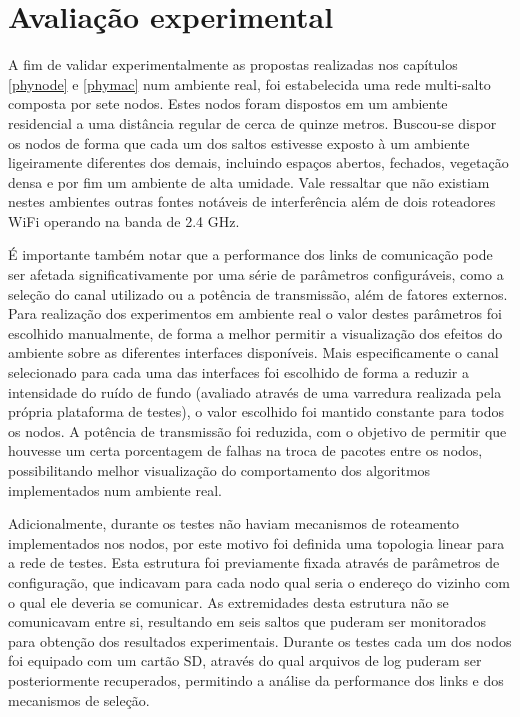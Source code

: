 \documentclass[
	12pt,				%
	openright,			%
	oneside,
	a4paper,			%
	english,			%
	french,				%
	spanish,			%
	brazil				%
	]{abntex2}
\begin{document}
\chapter{Avaliação experimental} \label{chap_exp}

A fim de validar experimentalmente as propostas realizadas nos capítulos \ref{phynode} e \ref{phymac} num ambiente real, foi estabelecida uma rede multi-salto composta por sete nodos. Estes nodos foram dispostos em um ambiente residencial a uma distância regular de cerca de quinze metros. Buscou-se dispor os nodos de forma que cada um dos saltos estivesse exposto à um ambiente ligeiramente diferentes dos demais, incluindo espaços abertos, fechados, vegetação densa e por fim um ambiente de alta umidade. Vale ressaltar que não existiam nestes ambientes outras fontes notáveis de interferência além de dois roteadores WiFi operando na banda de 2.4 GHz.

É importante também notar que a performance dos links de comunicação pode ser afetada significativamente por uma série de parâmetros configuráveis, como a seleção do canal utilizado ou a potência de transmissão, além de fatores externos. Para realização dos experimentos em ambiente real o valor destes parâmetros foi escolhido manualmente, de forma a melhor permitir a visualização dos efeitos do ambiente sobre as diferentes interfaces disponíveis. Mais especificamente o canal selecionado para cada uma das interfaces foi escolhido de forma a reduzir a intensidade do ruído de fundo (avaliado através de uma varredura realizada pela própria plataforma de testes), o valor escolhido foi mantido constante para todos os nodos. A potência de transmissão foi reduzida, com o objetivo de permitir que houvesse um certa porcentagem de falhas na troca de pacotes entre os nodos, possibilitando melhor visualização do comportamento dos algoritmos implementados num ambiente real.

Adicionalmente, durante os testes não haviam mecanismos de roteamento implementados nos nodos, por este motivo foi definida uma topologia linear para a rede de testes. Esta estrutura foi previamente fixada através de parâmetros de configuração, que indicavam para cada nodo qual seria o endereço do vizinho com o qual ele deveria se comunicar. As extremidades desta estrutura não se comunicavam entre si, resultando em seis saltos que puderam ser monitorados para obtenção dos resultados experimentais. Durante os testes cada um dos nodos foi equipado com um cartão SD, através do qual arquivos de log puderam ser posteriormente recuperados, permitindo a análise da performance dos links e dos mecanismos de seleção.
\end{document}
